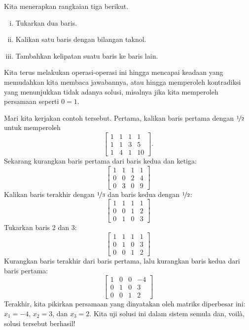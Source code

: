 \pagebreak[2]
Kita menerapkan rangkaian tiga
\emph{} berikut.
\begin{enumerate}[(i)]
\item Tukarkan dua baris.
\item Kalikan satu baris dengan bilangan taknol.
\item Tambahkan kelipatan suatu baris ke baris lain.
\end{enumerate}
Kita terus melakukan operasi-operasi ini hingga mencapai keadaan yang
memudahkan kita membaca jawabannya, atau hingga memperoleh kontradiksi yang menunjukkan
tidak adanya solusi, misalnya jika kita memperoleh persamaan seperti $0=1$.

Mari kita kerjakan contoh tersebut.  Pertama, kalikan baris pertama dengan
$\nicefrac{1}{2}$ untuk memperoleh
\begin{equation*}
\left[
\begin{array}{ccc|c}
1 & 1 & 1 & 1 \\
1 & 1 & 3 & 5 \\
1 & 4 & 1 & 10
\end{array}
\right] .
\end{equation*}
Sekarang kurangkan baris pertama dari baris kedua dan ketiga:
\begin{equation*}
\left[
\begin{array}{ccc|c}
1 & 1 & 1 & 1 \\
0 & 0 & 2 & 4 \\
0 & 3 & 0 & 9
\end{array}
\right]
\end{equation*}
Kalikan baris terakhir dengan $\nicefrac{1}{3}$ dan baris kedua dengan $\nicefrac{1}{2}$:
\begin{equation*}
\left[
\begin{array}{ccc|c}
1 & 1 & 1 & 1 \\
0 & 0 & 1 & 2 \\
0 & 1 & 0 & 3
\end{array}
\right]
\end{equation*}
Tukarkan baris 2 dan 3:
\begin{equation*}
\left[
\begin{array}{ccc|c}
1 & 1 & 1 & 1 \\
0 & 1 & 0 & 3 \\
0 & 0 & 1 & 2
\end{array}
\right]
\end{equation*}
Kurangkan baris terakhir dari baris pertama, lalu kurangkan baris kedua
dari baris pertama:
\begin{equation*}
\left[
\begin{array}{ccc|c}
1 & 0 & 0 & -4 \\
0 & 1 & 0 & 3 \\
0 & 0 & 1 & 2
\end{array}
\right]
\end{equation*}
Terakhir, kita pikirkan persamaan yang dinyatakan oleh matriks diperbesar ini:
$x_1 = -4$, $x_2 = 3$, dan $x_3 = 2$.  Kita uji solusi ini dalam sistem
semula dan, voil\`a, solusi tersebut berhasil!

